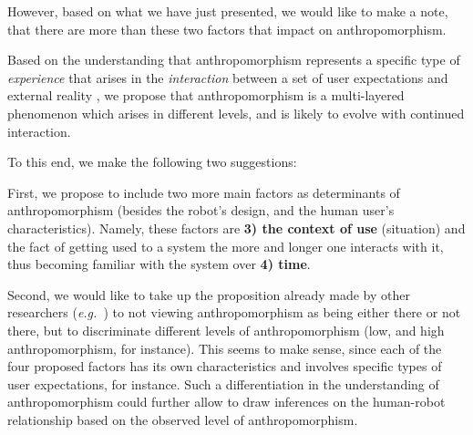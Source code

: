\documentclass{frontiersSCNS} %
\newcommand{\eg}{{\textit{e.g.~}}}
\begin{document}
However, based on what we have just presented, we would like to make a note, that there are more than these two factors that impact on anthropomorphism.

Based on the understanding that anthropomorphism represents a specific type of \textit{experience} that arises in the
\textit{interaction} between a set of user expectations and external reality
\cite{persson_anthropomorphism_2000}, 
we propose that
anthropomorphism is a multi-layered phenomenon which arises in different levels, and is likely to evolve with continued interaction.

To this end, we make the following two suggestions:

First, we propose to include two more main factors as determinants of anthropomorphism (besides the robot's design, and the human user's characteristics). Namely, these factors are \textbf{3) the context of use} (situation) and the fact of getting used to a system the more and longer one interacts with it, thus becoming familiar with the system over \textbf{4) time}. 

%

Second, we would like to take up the proposition already made by other researchers (\eg \cite{persson_anthropomorphism_2000,ruijten_introducing_2014}) to not viewing anthropomorphism as being either there or not there, but to discriminate different levels of
anthropomorphism (low, and high anthropomorphism, for instance).
This seems to make sense, since each of the four proposed factors has its own characteristics and involves specific
types of user expectations, for instance. Such a differentiation in the understanding of anthropomorphism could further allow to draw inferences
on the human-robot relationship based on the observed level of anthropomorphism.
\end{document}
